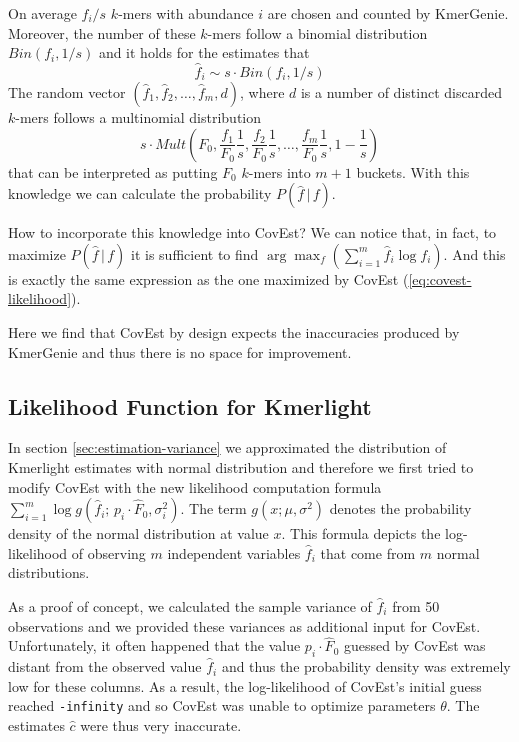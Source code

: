 On average $f_i / s$ $k$-mers with abundance $i$ are chosen and counted by KmerGenie.
Moreover, the number of these $k$-mers follow a binomial distribution $Bin(f_i, 1/s)$
and it holds for the estimates that
$$\hat f_i \sim s \cdot Bin(f_i, 1/s)$$
The random vector $(\hat f_1, \hat f_2, \dots, \hat f_m, d)$, where $d$ is a number
of distinct discarded $k$-mers follows a multinomial distribution 
$$s \cdot Mult\left(F_0, \frac{f_1}{F_0} \frac{1}{s}, \frac{f_2}{F_0} \frac{1}{s}, \dots, 
\frac{f_m}{F_0} \frac{1}{s}, 1-\frac{1}{s}\right)$$
that can be interpreted as putting $F_0$ $k$-mers into $m+1$ buckets. With this knowledge we can
calculate the probability $P(\hat f\,|\,f)$.

\medskip

How to incorporate this knowledge into CovEst? We can notice that, in fact, to maximize 
$P(\hat f\,|\,f)$ it is sufficient to find $\arg \max_f \left(\sum_{i=1}^m \hat f_i \log f_i
\right)$. And this is exactly the same expression as the one maximized by CovEst 
(\ref{eq:covest-likelihood}).

Here we find that CovEst by design expects the inaccuracies produced by KmerGenie
and thus there is no space for improvement.




\subsection{Likelihood Function for Kmerlight}
In section \ref{sec:estimation-variance} we approximated the distribution of Kmerlight
estimates with normal distribution and therefore
we first tried to modify CovEst with the new likelihood computation formula 
$\sum_{i=1}^m \log g(\hat f_i;\, p_i \cdot \hat F_0, \sigma_i^2)$. The term $g(x; \mu, \sigma^2)$  
denotes the probability density of the normal distribution at value $x$. This formula depicts the
log-likelihood of observing $m$ independent variables $\hat f_i$ that come from $m$
normal distributions.

As a proof of concept, we calculated the sample variance of $\hat f_i$ from 50 observations 
and we provided these variances as additional input for CovEst.
Unfortunately, it often happened that the value $p_i \cdot \hat F_0$ guessed by CovEst was distant
from the observed value $\hat f_i$ and thus the probability density was extremely low for these
columns. As a result, the log-likelihood of CovEst's initial guess reached \texttt{-infinity} 
and so CovEst was unable to optimize parameters $\theta$. The estimates $\hat c$ 
were thus very inaccurate.

